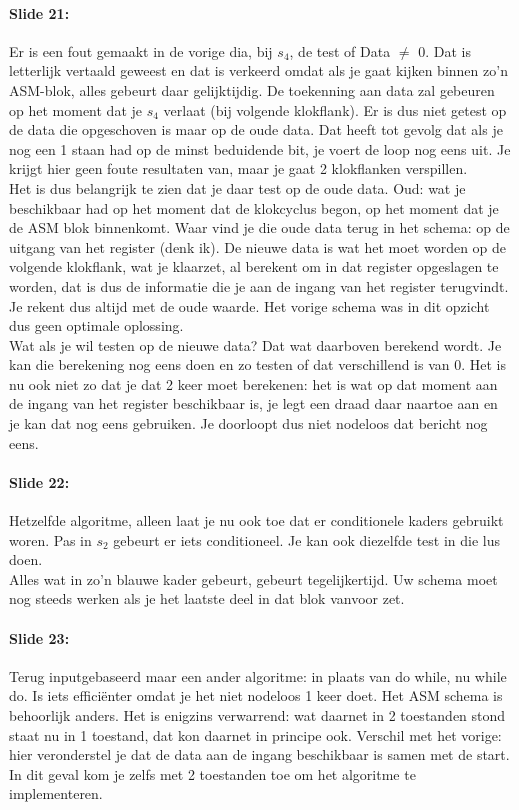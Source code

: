 \documentclass[10pt,a4paper]{book}
\begin{document}
\paragraph{Slide 21:} Er is een fout gemaakt in de vorige dia, bij $s_4$, de test of Data $\neq$ 0. Dat is letterlijk vertaald geweest en dat is verkeerd omdat als je gaat kijken binnen zo'n ASM-blok, alles gebeurt daar gelijktijdig. De toekenning aan data zal gebeuren op het moment dat je $s_4$ verlaat (bij volgende klokflank). Er is dus niet getest op de data die opgeschoven is maar op de oude data. Dat heeft tot gevolg dat als je nog een 1 staan had op de minst beduidende bit, je voert de loop nog eens uit. Je krijgt hier geen foute resultaten van, maar je gaat 2 klokflanken verspillen.\\
Het is dus belangrijk te zien dat je daar test op de oude data. Oud: wat je beschikbaar had op het moment dat de klokcyclus begon, op het moment dat je de ASM blok binnenkomt. Waar vind je die oude data terug in het schema: op de uitgang van het register (denk ik). De nieuwe data is wat het moet worden op de volgende klokflank, wat je klaarzet, al berekent om in dat register opgeslagen te worden, dat is dus de informatie die je aan de ingang van het register terugvindt. Je rekent dus altijd met de oude waarde. Het vorige schema was in dit opzicht dus geen optimale oplossing.\\
Wat als je wil testen op de nieuwe data? Dat wat daarboven berekend wordt. Je kan die berekening nog eens doen en zo testen of dat verschillend is van 0. Het is nu ook niet zo dat je dat 2 keer moet berekenen: het is wat op dat moment aan de ingang van het register beschikbaar is, je legt een draad daar naartoe aan en je kan dat nog eens gebruiken. Je doorloopt dus niet nodeloos dat bericht nog eens.

\paragraph{Slide 22:} Hetzelfde algoritme, alleen laat je nu ook toe dat er conditionele kaders gebruikt woren. Pas in $s_2$ gebeurt er iets conditioneel. Je kan ook diezelfde test in die lus doen.\\
Alles wat in zo'n blauwe kader gebeurt, gebeurt tegelijkertijd. Uw schema moet nog steeds werken als je het laatste deel in dat blok vanvoor zet. 

\paragraph{Slide 23:} Terug inputgebaseerd maar een ander algoritme: in plaats van do while, nu while do. Is iets effici\"enter omdat je het niet nodeloos 1 keer doet. Het ASM schema is behoorlijk anders. Het is enigzins verwarrend: wat daarnet in 2 toestanden stond staat nu in 1 toestand, dat kon daarnet in principe ook. Verschil met het vorige: hier veronderstel je dat de data aan de ingang beschikbaar is samen met de start. In dit geval kom je zelfs met 2 toestanden toe om het algoritme te implementeren.
\end{document}
